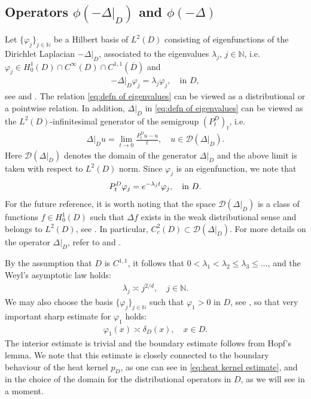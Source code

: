 \documentclass[12pt,a4paper,onecolumn]{amsart}
\theoremstyle{definition}
\newcommand{\N}{\mathbb{N}}
\newcommand{\1}{\mathbf 1}
\newcommand{\DD}{\mathcal{D}}
\newcommand{\de}{\delta_D}
\numberwithin{equation}{section}
\begin{document}
\subsection{Operators \texorpdfstring{$\phi(-\Delta\vert_D)$}{phi(-Delta|D)} and \texorpdfstring{$\phi(-\Delta)$}{phi(-Delta)}}\label{ss:operator}
Let $\{\varphi_j\}_{j\in\N}$ 
be a Hilbert basis of $L^2(D)$ consisting of eigenfunctions 
of the Dirichlet Laplacian $-\Delta\vert_D$, 
associated to the eigenvalues $\lambda_j$, $j\in\N$, i.e.  $\varphi_j\in H^1_0(D)\cap C^{ \infty}(D)\cap C^{1,1}(\overline D)$ and
\begin{align}\label{eq:defn of eigenvalues}
	-\Delta\vert_D\varphi_j=\lambda_j\varphi_j, \quad \text{in $D$},
\end{align}
see \cite[Theorem 9.31]{brezis} and \cite[Section 8.11]{gilbarg_pde}. The relation \eqref{eq:defn of eigenvalues} can be viewed as a distributional or a pointwise relation. In addition, $\Delta\vert_D$ in \eqref{eq:defn of eigenvalues} can be viewed as the $L^2(D)$-infinitesimal generator of the semigroup $(P_t^D)_t$, i.e.
\begin{align*}
	\left.\Delta\right\vert_D u=\lim_{t\to 0}\frac{P_t^D u-u}{t}, \quad u\in \DD(\left.\Delta\right\vert_D).
\end{align*}
Here $\DD(\Delta\vert_D)$ denotes the domain of the generator $\Delta\vert_D$ and the above limit is taken with respect to $L^2(D)$ norm. Since $\varphi_j$ is an eigenfunction, we note that
\begin{align}\label{eq:Pt=e{-lt}}
    P_t^D\varphi_j=e^{-\lambda_j t}\varphi_j, \quad \text{in $D$}.
\end{align}
For the future reference, it is worth noting that the space $\DD(\left.\Delta\right\vert_D)$ is a class of functions $f\in H_0^1(D)$ such that $\Delta f$ exists in the weak distributional sense and belongs to $L^2(D)$, see \cite[Theorem 2.13]{chung_zhao}. In particular, $C_c^2(D)\subset \DD(\left.\Delta\right\vert_D)$. For more details on the operator $\left.\Delta\right\vert_D$, refer to \cite[Chapter 2]{chung_zhao} and \cite[Chapter 9]{brezis}. 

By the assumption that $D$ is $C^{1,1}$, it follows that $0<\lambda_1< \lambda_2\le\lambda_3\le \dots$, and the Weyl's asymptotic law holds:
\begin{align}\label{eq:Weyl's law}
	\lambda_j \asymp j^{2/d},\quad j\in \N.
\end{align}
We may also choose the basis $\{\varphi_j\}_{j\in \N}$ such that $\varphi_1>0$ in $D$, see \cite[Chapter 9]{brezis}, so that very important sharp estimate for $\varphi_1$ holds:
\begin{align}\label{eq:varphi=de sharp estimate}
	\varphi_1(x)\asymp \de(x),\quad x\in D.
\end{align}
The interior estimate is trivial and the boundary estimate follows from Hopf's lemma. We note that this estimate is closely connected to the boundary behaviour of the heat kernel $p_D$, as one can see in \eqref{eq:heat kernel estimate}, and in the choice of the domain for the distributional operators in $D$, as we will see in a moment.
\end{document}
